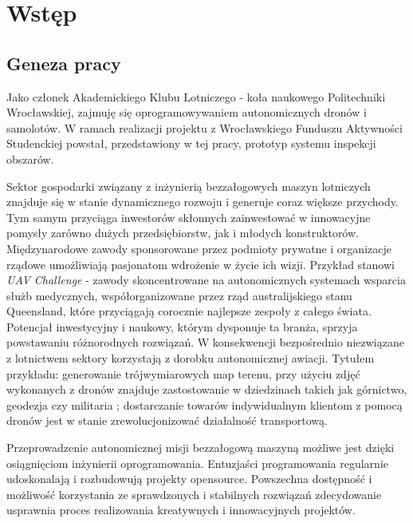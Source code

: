 \chapter{Wstęp}


\section{Geneza pracy} \label{intro_genesis}

Jako członek Akademickiego Klubu Lotniczego - koła naukowego Politechniki Wrocławskiej,
zajmuję się oprogramowywaniem autonomicznych dronów i samolotów. W ramach realizacji
projektu z Wrocławskiego Funduszu Aktywności Studenckiej powstał, przedstawiony w
tej pracy, prototyp systemu inspekcji obszarów.

Sektor gospodarki związany z inżynierią bezzałogowych maszyn lotniczych znajduje się
w stanie dynamicznego rozwoju i generuje coraz większe przychody.
Tym samym przyciąga inwestorów skłonnych zainwestować w innowacyjne pomysły zarówno 
dużych przedsiębiorstw, jak i młodych konstruktorów. Międzynarodowe zawody sponsorowane
przez podmioty prywatne i organizacje rządowe umożliwiają pasjonatom wdrożenie w życie
ich wizji. Przykład stanowi \textit{UAV Challenge} - zawody skoncentrowane na
autonomicznych systemach wsparcia służb medycznych, współorganizowane przez rząd
australijskiego stanu Queensland, które przyciągają corocznie najlepsze zespoły z całego
świata\cite{uav_sponsors}. Potencjał inwestycyjny i naukowy, którym dysponuje ta branża,
sprzyja powstawaniu różnorodnych rozwiązań. W konsekwencji bezpośrednio niezwiązane z
lotnictwem sektory korzystają z dorobku autonomicznej awiacji. Tytułem przykładu: 
generowanie trójwymiarowych map terenu, przy użyciu zdjęć wykonanych z dronów znajduje
zastostowanie w dziedzinach takich jak górnictwo, geodezja czy militaria
\cite{uav_photogrametry}; dostarczanie towarów indywidualnym klientom z pomocą
dronów jest w stanie zrewolucjonizować działalność transportową.

Przeprowadzenie autonomicznej misji bezzałogową maszyną możliwe jest dzięki osiągnięciom
inżynierii oprogramowania. Entuzjaści programowania regularnie udoskonalają i rozbudowują
projekty opensource. Powszechna dostępność i możliwość korzystania ze sprawdzonych
i stabilnych rozwiązań zdecydowanie usprawnia proces realizowania
kreatywnych i innowacyjnych projektów. 


